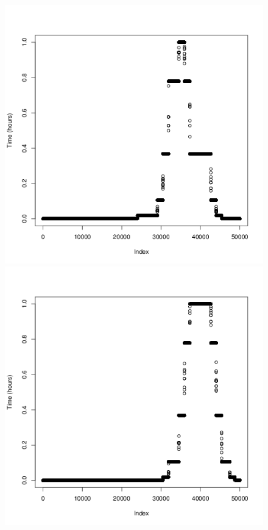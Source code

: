 \documentclass[a4paper, twocolumn]{article}
\begin{document}
\begin{figure}[H]
\begin{minipage}[]{0.2\textwidth}
	    \end{minipage}
	    \begin{minipage}[]{0.2\textwidth}
	    	\includegraphics[width=\textwidth]{share/7_time.png}
	    \end{minipage}
	    \begin{minipage}[]{0.2\textwidth}
	   		 \includegraphics[width=\textwidth]{share/8_time.png}

\end{minipage}
\end{figure}
\end{document}
